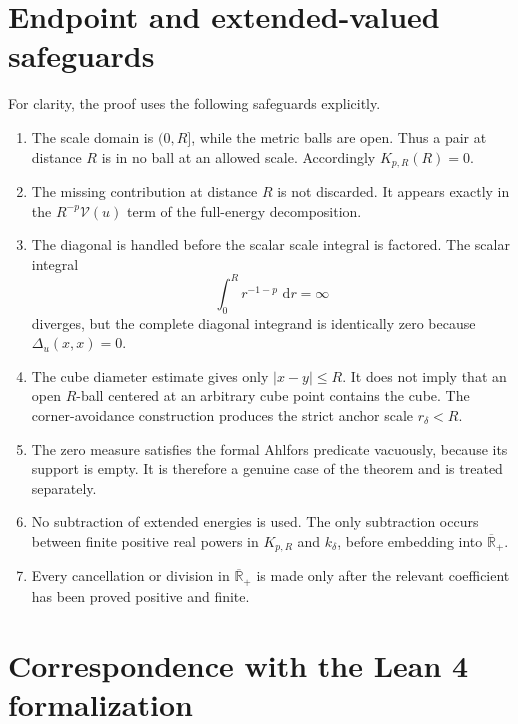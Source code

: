 \documentclass[11pt]{article}
\theoremstyle{remark}
\newcommand{\Rbarp}{\overline{\mathbb R}_{+}}
\newcommand{\dd}{\,\mathrm{d}}
\newcommand{\Venergy}{\mathcal V}
\begin{document}
\section{Endpoint and extended-valued safeguards}

For clarity, the proof uses the following safeguards explicitly.

\begin{enumerate}
  \item The scale domain is \((0,R]\), while the metric balls are open.
  Thus a pair at distance \(R\) is in no ball at an allowed scale.
  Accordingly \(K_{p,R}(R)=0\).

  \item The missing contribution at distance \(R\) is not discarded.  It
  appears exactly in the \(R^{-p}\Venergy(u)\) term of the full-energy
  decomposition.

  \item The diagonal is handled before the scalar scale integral is
  factored.  The scalar integral
  \[
    \int_0^R r^{-1-p}\,\dd r=\infty
  \]
  diverges, but the complete diagonal integrand is identically zero because
  \(\Delta_u(x,x)=0\).

  \item The cube diameter estimate gives only
  \(\lvert x-y\rvert\leq R\).  It does not imply that an open
  \(R\)-ball centered at an arbitrary cube point contains the cube.
  The corner-avoidance construction produces the strict anchor scale
  \(r_\delta<R\).

  \item The zero measure satisfies the formal Ahlfors predicate vacuously,
  because its support is empty.  It is therefore a genuine case of the
  theorem and is treated separately.

  \item No subtraction of extended energies is used.  The only subtraction
  occurs between finite positive real powers in
  \(K_{p,R}\) and \(k_\delta\), before embedding into \(\Rbarp\).

  \item Every cancellation or division in \(\Rbarp\) is made only after
  the relevant coefficient has been proved positive and finite.
\end{enumerate}

\appendix

\section{Correspondence with the Lean 4 formalization}
\end{document}
